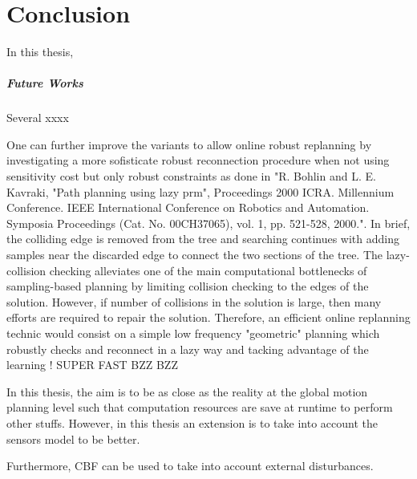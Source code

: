 \chapter{Conclusion}\label{chap:concl}

\glsresetall

In this thesis, 

\paragraph{Future Works} Several xxxx 

One can further improve the  variants to allow online robust replanning by investigating a more sofisticate robust reconnection procedure when not using sensitivity cost but only robust constraints as done in "R. Bohlin and L. E. Kavraki, "Path planning using lazy prm", Proceedings 2000 ICRA. Millennium Conference. IEEE International Conference on Robotics and Automation. Symposia Proceedings (Cat. No. 00CH37065), vol. 1, pp. 521-528, 2000.".
In brief, the colliding edge is removed from the tree and searching continues with adding samples near the discarded edge to connect the two sections of the tree. The lazy-collision checking alleviates one of the main computational bottlenecks of sampling-based planning by limiting collision checking to the edges of the solution. 
However, if number of collisions in the solution is large, then many efforts are required to repair the solution. 
Therefore, an efficient online replanning technic would consist on a simple low frequency "geometric" planning which robustly checks and reconnect in a lazy way and tacking advantage of the learning ! SUPER FAST BZZ BZZ 

In this thesis, the aim is to be as close as the reality at the global motion planning level such that computation resources are save at runtime to perform other stuffs.
However, in this thesis an extension is to take into account the sensors model to be better.

Furthermore, CBF can be used to take into account external disturbances.